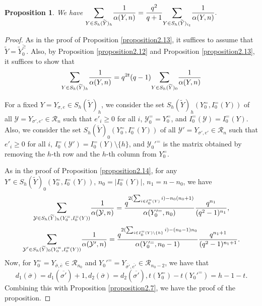 \documentclass[11pt,oneside]{amsart}
\theoremstyle{plain}
\newtheorem{proposition}[theorem]{Proposition}
\theoremstyle{definition}
\theoremstyle{remark}
\newcommand{\CR}{{\mathcal R}}
\newcommand{\CY}{{\mathcal Y}}
\numberwithin{equation}{section}
\begin{document}
	
	\begin{proposition}\label{proposition2.15}
		We have
		$
		\mathlarger{\sum}_{Y \in S_h(\widetilde{Y})_{h}} \dfrac{1}{\alpha(Y,n)}=\dfrac{q^2}{q+1}\mathlarger{\sum}_{Y \in S_h(\widetilde{Y})_{i_{t}}} \dfrac{1}{\alpha(Y,n)}.
		$
	\end{proposition}
	\begin{proof} As in the proof of Proposition \ref{proposition2.13}, it suffices to assume that $\widetilde{Y}=\widetilde{Y}_0^{\geq}$. Also, by Proposition \ref{proposition2.12} and Proposition \ref{proposition2.13}, it suffices to show that
		\begin{equation*}
			\mathlarger{\sum}_{Y \in S_h(\widetilde{Y})_{h}} \dfrac{1}{\alpha(Y,n)}=q^{2t}(q-1)\mathlarger{\sum}_{Y \in S_h(\widetilde{Y})_{0}} \dfrac{1}{\alpha(Y,n)}
		\end{equation*}
		
		For a fixed $Y=Y_{\sigma,e} \in S_h(\widetilde{Y})_{h}$, we consider the set $S_h(\widetilde{Y})_{h}(Y_0^=,I_0^=(Y))$ of all $\CY=Y_{\sigma',e'} \in \CR_n$ such that $e'_i \geq 0$ for all $i$, $\CY_0^==Y_0^{=}$, and $I_0^=(\CY)=I_0^=(Y)$. Also, we consider the set $S_h(\widetilde{Y})_{0}(Y_0^=,I_0^=(Y))$ of all $\CY'=Y_{\sigma',e'} \in \CR_n$ such that $e'_i \geq 0$ for all $i$, $I_0^=(\CY')=I_0^=(Y)\setminus \lbrace h\rbrace$, and $\CY_0'^=$ is the matrix obtained by removing the $h$-th row and the $h$-th column from $Y_0^{=}$.
		
		As in the proof of Proposition \ref{proposition2.14}, for any $Y' \in S_h(\widetilde{Y})_{0}(Y_0^=,I_0^=(Y))$, $n_0=\vert I_0^=(Y) \vert$, $n_1=n-n_0$, we have
		\begin{equation*}
			\mathlarger{\sum}_{\CY \in 	S_h(\widetilde{Y})_{h}(Y_0^=,I_0^=(Y))} \dfrac{1}{\alpha(\CY,n)}=\dfrac{q^{2(\sum_{i \in I_0^{=}(Y)} i)-n_0(n_0+1)}}{\alpha(Y_0'^{=},n_0)}\dfrac{q^{n_1}}{(q^2-1)^{n_1}},
		\end{equation*}
		\begin{equation*}
			\mathlarger{\sum}_{\CY' \in 	S_h(\widetilde{Y})_{0}(Y_0^=,I_0^=(Y))} \dfrac{1}{\alpha(\CY',n)}=\dfrac{q^{2(\sum_{i \in I_0^{=}(Y)\setminus \lbrace h\rbrace} i)-(n_0-1)n_0}}{\alpha(Y_0'^{=},n_0-1)}\dfrac{q^{n_1+1}}{(q^2-1)^{n_1+1}}.
		\end{equation*}
		Now, for $Y_0^==Y_{\overline{\sigma},\overline{e}} \in \CR_{n_0}$ and $Y_0'^==Y_{\overline{\sigma'},\overline{e'}} \in \CR_{n_0-2}$, we have that
		\begin{equation*}
			d_1(\overline{\sigma})=d_1({\overline{\sigma'}})+1, d_2({\overline{\sigma}})=d_2({\overline{\sigma'}}), t(Y_0^=)-t(Y_0'^=)=h-1-t.
		\end{equation*}
		Combining this with Proposition \ref{proposition2.7}, we have the proof of the proposition.
		
	\end{proof}
	
\end{document}
